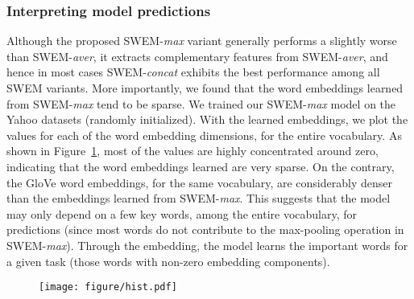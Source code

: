 \documentclass[11pt,a4paper]{article}
\begin{document}
\subsubsection{Interpreting model predictions}
Although the proposed SWEM-\emph{max} variant generally performs a slightly worse than SWEM-\emph{aver}, it extracts complementary features from SWEM-\emph{aver}, and hence in most cases SWEM-\emph{concat} exhibits the best performance among all SWEM variants.
More importantly, we found that the word embeddings learned from  SWEM-\emph{max} tend to be sparse.
We trained our SWEM-\emph{max} model on the Yahoo datasets (randomly initialized). With the learned embeddings, we plot the values for each of the word embedding dimensions, for the entire vocabulary.
As shown in Figure~\ref{fig:sparsity}, most of the values are highly concentrated around zero, indicating that the word embeddings learned are very sparse. On the contrary, the GloVe word embeddings, for the same vocabulary, are considerably denser than the embeddings learned from SWEM-\emph{max}.
This suggests that the model may only depend on a few key words, among the entire vocabulary, for predictions (since most words do not contribute to the max-pooling operation in SWEM-\emph{max}). Through the embedding, the model learns the important words for a given task (those words with non-zero embedding components). \par 

\begin{figure}[h!] \centering 
	\def\arraystretch{1.0}
\vspace{-2mm}
\texttt{[image: figure/hist.pdf]}
	\vspace{-2mm}
	\label{fig:sparsity}
	\vspace{-2mm}
\end{figure}
\end{document}
